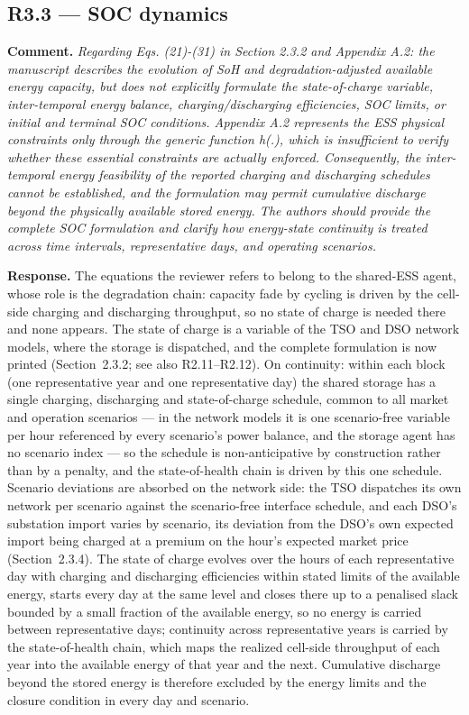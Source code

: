 \documentclass[11pt]{article}
\newcommand{\rcomment}[1]{\par\medskip\noindent\textbf{Comment.} \textit{#1}\par\smallskip}
\newcommand{\rresponse}[1]{\noindent\textbf{Response.} #1\par\smallskip}
\begin{document}
\subsection*{R3.3 --- SOC dynamics}
\rcomment{
Regarding Eqs. (21)-(31) in Section 2.3.2 and Appendix A.2: the manuscript describes the evolution of SoH and degradation-adjusted available energy capacity, but does not explicitly formulate the state-of-charge variable, inter-temporal energy balance, charging/discharging efficiencies, SOC limits, or initial and terminal SOC conditions. Appendix A.2 represents the ESS physical constraints only through the generic function h(.), which is insufficient to verify whether these essential constraints are actually enforced. Consequently, the inter-temporal energy feasibility of the reported charging and discharging schedules cannot be established, and the formulation may permit cumulative discharge beyond the physically available stored energy. The authors should provide the complete SOC formulation and clarify how energy-state continuity is treated across time intervals, representative days, and operating scenarios.
}
\rresponse{The equations the reviewer refers to belong to the shared-ESS agent, whose role is the degradation chain: capacity fade by cycling is driven by the cell-side charging and discharging throughput, so no state of charge is needed there and none appears. The state of charge is a variable of the TSO and DSO network models, where the storage is dispatched, and the complete formulation is now printed (Section~2.3.2; see also R2.11--R2.12). On continuity: within each block (one representative year and one representative day) the shared storage has a single charging, discharging and state-of-charge schedule, common to all market and operation scenarios --- in the network models it is one scenario-free variable per hour referenced by every scenario's power balance, and the storage agent has no scenario index --- so the schedule is non-anticipative by construction rather than by a penalty, and the state-of-health chain is driven by this one schedule. Scenario deviations are absorbed on the network side: the TSO dispatches its own network per scenario against the scenario-free interface schedule, and each DSO's substation import varies by scenario, its deviation from the DSO's own expected import being charged at a premium on the hour's expected market price (Section~2.3.4). The state of charge evolves over the hours of each representative day with charging and discharging efficiencies within stated limits of the available energy, starts every day at the same level and closes there up to a penalised slack bounded by a small fraction of the available energy, so no energy is carried between representative days; continuity across representative years is carried by the state-of-health chain, which maps the realized cell-side throughput of each year into the available energy of that year and the next. Cumulative discharge beyond the stored energy is therefore excluded by the energy limits and the closure condition in every day and scenario.}
\end{document}
